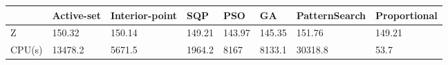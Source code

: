 \begin{tabular}{llllllll}
& Active-set & Interior-point & SQP & PSO & GA & PatternSearch & Proportional \\ 
\hline 
Z & 150.32 & 150.14 & 149.21 & 143.97 & 145.35 & 151.76 & 149.21 \\ 
CPU(s) & 13478.2 & 5671.5 & 1964.2 & 8167 & 8133.1 & 30318.8 & 53.7 \\ 
\hline 
\end{tabular}